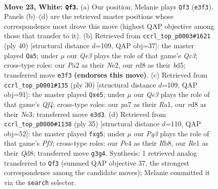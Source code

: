 \documentclass[11pt]{article}
\begin{document}
\clearpage

\begin{figure}[p]\centering
\begin{subfigure}{0.46\textwidth}\centering
\resizebox{\linewidth}{!}{%
\newchessgame
\chessboard[
  setfen={1rbr4/ppp2pk1/3p4/2P1b1qp/N3Pn2/4Q1Pp/PP3P2/RBB1R1K1 w - - 1 23},
  showmover=false,
  pgfstyle=straightmove, color=movearrow, markmove={e3-f3}
]}
\caption{}
\end{subfigure}\hfill
\begin{subfigure}{0.46\textwidth}\centering
\resizebox{\linewidth}{!}{%
\newchessgame
\chessboard[
  setfen={2r1kb1r/1q3ppp/p3pn2/3b2P1/p3pP2/P1Q1B3/1PP1N2P/1K1R1BR1 w k - 1 21},
  showmover=false,
  pgfstyle=straightmove, color=movearrow, markmove={c3-a5}
]}
\caption{}
\end{subfigure}
\\[4pt]
\begin{subfigure}{0.46\textwidth}\centering
\resizebox{\linewidth}{!}{%
\newchessgame
\chessboard[
  setfen={2b1k2r/1pqp1ppp/4p3/rpb1n3/3PPQ2/2N3P1/PP3P1P/R1BR2K1 w k - 1 16},
  showmover=false,
  pgfstyle=straightmove, color=movearrow, markmove={f4-e5}
]}
\caption{}
\end{subfigure}\hfill
\begin{subfigure}{0.46\textwidth}\centering
\resizebox{\linewidth}{!}{%
\newchessgame
\chessboard[
  setfen={1rbqk2r/7p/3pppp1/1pp1b1BP/3nNP2/3P2P1/PP1Q2B1/R4K1R b k - 0 18},
  showmover=false,
  pgfstyle=straightmove, color=movearrow, markmove={f6-g5}
]}
\caption{}
\end{subfigure}
\caption{\textbf{Move 23, White: \texttt{Qf3}.} (a) Our position; Melanie plays \texttt{Qf3} (\texttt{e3f3}). Panels (b)--(d) are the retrieved master positions whose correspondence most drove this move (highest QAP objective among those that transfer to it). (b) Retrieved from \texttt{ccrl\_top\_p0003\#1621} (ply 40) [structural distance $d$=109, QAP obj=37]: the master played \texttt{Qa5}; under $\mu$ our \emph{Qe3} plays the role of that game's \emph{Qc3}; cross-type roles: our \emph{P}a2 as their \emph{N}e2, our \emph{r}d8 as their \emph{b}d5; transferred move \texttt{e3f3} \textbf{(endorses this move)}. (c) Retrieved from \texttt{ccrl\_top\_p0001\#135} (ply 30) [structural distance $d$=109, QAP obj=91]: the master played \texttt{Qxe5}; under $\mu$ our \emph{Qe3} plays the role of that game's \emph{Qf4}; cross-type roles: our \emph{p}a7 as their \emph{R}a1, our \emph{r}d8 as their \emph{N}c3; transferred move \texttt{e3d3}. (d) Retrieved from \texttt{ccrl\_top\_p0000\#1138} (ply 35) [structural distance $d$=110, QAP obj=52]: the master played \texttt{fxg5}; under $\mu$ our \emph{Pg3} plays the role of that game's \emph{Pf3}; cross-type roles: our \emph{P}e4 as their \emph{R}b8, our \emph{R}e1 as their \emph{Q}d8; transferred move \texttt{g3g4}. Synthesis: 1 retrieved analog transferred to \texttt{Qf3} (summed QAP objective 37, the strongest correspondence among the candidate moves); Melanie committed it via the \texttt{search} selector.}
\label{fig:thought-m44}
\end{figure}
\end{document}

